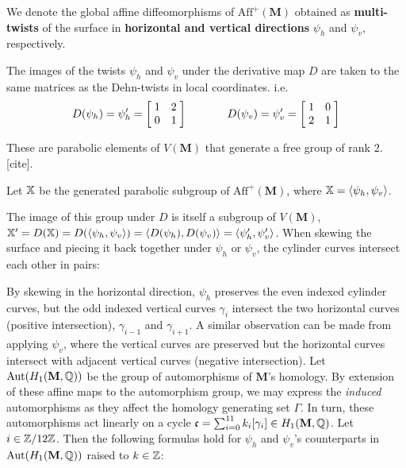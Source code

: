 \documentclass[a4paper, 11pt]{article}
\def\bM{\mathbf{M}}
\def\<{\langle} \def\>{\rangle}
\def\Aut{\mathrm{Aut}}
\begin{document}
\begin{Def}
We denote the global affine diffeomorphisms of $\text{Aff}^+(\bM)$ obtained as \textbf{multi-twists} of the surface in \textbf{horizontal and vertical directions} $\psi_h$ and $\psi_v$, respectively.
\end{Def}

The images of the twists $\psi_h$ and $\psi_v$ under the derivative map $D$ are taken to the same matrices as the Dehn-twists in local coordinates. i.e.
\begin{align*}
D(\psi_h)=\psi_h'=\left[ \hspace{1mm} \begin{matrix}
				1 &   2\\
				0 & 1
			\end{matrix}\hspace{1mm}\right] \hspace{0.5in}
			D(\psi_v)=\psi_v'=\left[ \hspace{1mm} \begin{matrix}
							1 & 0\\
							 2 & 1
						\end{matrix}\hspace{1mm}\right]
\end{align*}

These are parabolic elements of $V(\bM)$ that generate a free group of rank 2. [cite].
\begin{Def}
Let $\mathbb{X}$ be the generated parabolic subgroup of $\text{Aff}^+(\bM)$, where $\XX=\<\psi_h,\psi_v \>$.
\end{Def}

The image of this group under $D$ is itself a subgroup of $V(\bM)$, $\XX'=D(\XX)=D(\<\psi_h,\psi_v \>)=\<D(\psi_h),D(\psi_v)\>=\<\psi_h',\psi_v' \>$. When skewing the surface and piecing it back together under $\psi_h$ or $\psi_v$, the cylinder curves intersect each other in pairs:

\begin{figure}[H]
\centering

\end{figure}

By skewing in the horizontal direction, $\psi_h$ preserves the even indexed cylinder curves, but the odd indexed vertical curves $\gamma_i$ intersect the two horizontal curves (positive intersection), $\gamma_{i-1}$ and $\gamma_{i+1}$. A similar observation can be made from applying $\psi_v$, where the vertical curves are preserved but the horizontal curves intersect with adjacent vertical curves (negative intersection). Let $\Aut(H_1(\bM,\QQ))$ be the group of automorphisms of $\bM$'s homology. By extension of these affine maps to the automorphism group, we may express the \emph{induced} automorphisms as they affect the homology generating set $\Gamma$. In turn, these automorphisms act linearly on a cycle $\mathfrak{c}=\sum_{i=0}^{11}k_i[\gamma_i]\in H_1(\bM,\QQ)$. Let $i\in\mathbb{Z}/12\mathbb{Z}$. Then the following formulas hold for $\psi_h$ and $\psi_v$'s counterparts in $\Aut(H_1(\bM,\QQ))$ raised to $k\in\mathbb{Z}$:
\end{document}
